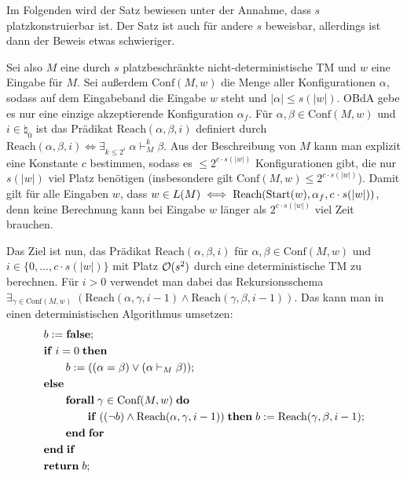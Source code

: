 \begin{Beweis}
    Im Folgenden wird der Satz bewiesen unter der Annahme, dass $s$ platzkonstruierbar ist.
    Der Satz ist auch für andere $s$ beweisbar, allerdings ist dann der Beweis etwas schwieriger.

    Sei also $M$ eine durch $s$ platzbeschränkte nicht-deterministische TM und $w$ eine Eingabe
    für $M$.
    Sei außerdem $\text{Conf}(M, w)$ die Menge aller Konfigurationen $\alpha$, sodass
    auf dem Eingabeband die Eingabe $w$ steht und $|\alpha| \le s(|w|)$.
    OBdA gebe es nur eine einzige akzeptierende Konfiguration $\alpha_f$.
    Für $\alpha, \beta \in \text{Conf}(M, w)$ und $i \in \natural_0$ ist das Prädikat
    $\text{Reach}(\alpha, \beta, i)$ definiert durch
    $\text{Reach}(\alpha, \beta, i) \iff \exists_{k \le 2^i}\; \alpha \vdash_M^k \beta$.
    Aus der Beschreibung von $M$ kann man explizit eine Konstante $c$ bestimmen, sodass
    es $\le 2^{c \cdot s(|w|)}$ Konfigurationen gibt, die nur $s(|w|)$ viel Platz benötigen
    (insbesondere gilt $\text{Conf}(M, w) \le 2^{c \cdot s(|w|)}$).
    Damit gilt für alle Eingaben $w$, dass
    $w \in L(M) \iff \text{Reach}(\text{Start}(w), \alpha_f, c \cdot s(|w|))$, denn
    keine Berechnung kann bei Eingabe $w$ länger als $2^{c \cdot s(|w|)}$ viel Zeit brauchen.

    Das Ziel ist nun, das Prädikat $\text{Reach}(\alpha, \beta, i)$ für
    $\alpha, \beta \in \text{Conf}(M, w)$ und $i \in \{0, \dotsc, c \cdot s(|w|)\}$ mit
    Platz $\mathcal{O}(s^2)$ durch eine deterministische TM zu berechnen.
    Für $i > 0$ verwendet man dabei das Rekursionsschema
    $\exists_{\gamma \in \text{Conf}(M, w)}\; (\text{Reach}(\alpha, \gamma, i - 1) \land
    \text{Reach}(\gamma, \beta, i - 1))$.
    Das kann man in einen deterministischen Algorithmus umsetzen:
    \begin{align*}
        &b := \mathbf{false};\\
        &\mathbf{if}\; i = 0 \;\mathbf{then}\;\\
        &\qquad b := ((\alpha = \beta) \lor (\alpha \vdash_M \beta));\\
        &\mathbf{else}\;\\
        &\qquad \mathbf{forall}\; \gamma \in \text{Conf}(M, w) \;\mathbf{do}\;\\
        &\qquad \qquad \mathbf{if}\; ((\lnot b) \land \text{Reach}(\alpha, \gamma, i - 1)) \;\mathbf{then}\;
        b := \text{Reach}(\gamma, \beta, i - 1);\\
        &\qquad \mathbf{end}\;\mathbf{for}\;\\
        &\mathbf{end}\;\mathbf{if}\;\\
        &\mathbf{return}\; b;
    \end{align*}


\end{Beweis}

